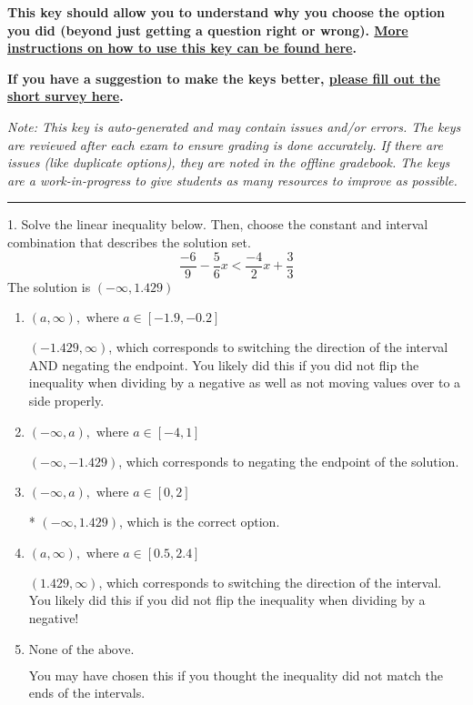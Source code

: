 \documentclass{extbook}[14pt]
\begin{document}
\textbf{This key should allow you to understand why you choose the option you did (beyond just getting a question right or wrong). \href{https://xronos.clas.ufl.edu/mac1105spring2020/courseDescriptionAndMisc/Exams/LearningFromResults}{More instructions on how to use this key can be found here}.}

\textbf{If you have a suggestion to make the keys better, \href{https://forms.gle/CZkbZmPbC9XALEE88}{please fill out the short survey here}.}

\textit{Note: This key is auto-generated and may contain issues and/or errors. The keys are reviewed after each exam to ensure grading is done accurately. If there are issues (like duplicate options), they are noted in the offline gradebook. The keys are a work-in-progress to give students as many resources to improve as possible.}

\rule{\textwidth}{0.4pt}

1. Solve the linear inequality below. Then, choose the constant and interval combination that describes the solution set.
\[ \frac{-6}{9} - \frac{5}{6} x < \frac{-4}{2} x + \frac{3}{3} \] 
The solution is $ (-\infty, 1.429) $ 

\begin{enumerate}[label=\Alph*.] 
\item $ (a, \infty), \text{ where } a \in [-1.9, -0.2] $ 

  $(-1.429, \infty)$, which corresponds to switching the direction of the interval AND negating the endpoint. You likely did this if you did not flip the inequality when dividing by a negative as well as not moving values over to a side properly. 
\item $ (-\infty, a), \text{ where } a \in [-4, 1] $ 

  $(-\infty, -1.429)$, which corresponds to negating the endpoint of the solution. 
\item $ (-\infty, a), \text{ where } a \in [0, 2] $ 

 * $(-\infty, 1.429)$, which is the correct option. 
\item $ (a, \infty), \text{ where } a \in [0.5, 2.4] $ 

  $(1.429, \infty)$, which corresponds to switching the direction of the interval. You likely did this if you did not flip the inequality when dividing by a negative! 
\item $ \text{None of the above}. $ 

 You may have chosen this if you thought the inequality did not match the ends of the intervals. 
\end{enumerate} 
 
\end{document}
